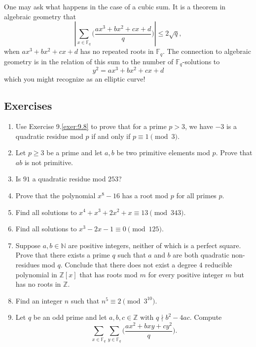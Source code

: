 \documentclass{article}
\def\Z{{\mathbb Z}}
\def\F{{\mathbb F}}
\def\N{{\mathbb N}}
\def\Z{{\mathbb Z}}
\def\F{{\mathbb F}}
\renewcommand{\lg}[2]{\Big(\frac{#1}{#2}\Big)}
\begin{document}
\vspace{5pt}
One may ask what happens in the case of a cubic sum. It is a theorem in algebraic geometry that
$$\left|\sum_{x\in\F_q} \lg{ax^3 + bx^2 + cx + d}{q}\right| \leq 2\sqrt{q},$$
when $ax^3 + bx^2 + cx + d$ has no repeated roots in $\F_q$. The connection to algebraic geometry is in the relation of this sum to the number of $\F_q$-solutions to $$y^2 = ax^3 + bx^2 + cx + d$$
which you might recognize as an elliptic curve!

\subsection*{Exercises}
\begin{enumerate}[\thesection .1]
    \item Use Exercise 9.\ref{exer:9.8} to prove that for a prime $p>3$, we have $-3$ is a quadratic residue mod $p$ if and only if $p\equiv 1\pmod{3}$.
    \item Let $p\geq 3$ be a prime and let $a,b$ be two primitive elements mod $p$. Prove that $ab$ is not primitive.
    \item Is $91$ a quadratic residue mod $253$?
    \item Prove that the polynomial $x^8 - 16$ has a root mod $p$ for all primes $p$.
    
    \item Find all solutions to $x^4 + x^3 + 2x^2 + x\equiv 13\pmod{343}$.
    \item Find all solutions to $x^3 - 2x - 1\equiv 0\pmod{125}.$
    \item Suppose $a,b\in\N$ are positive integers, neither of which is a perfect square. Prove that there exists a prime $q$ such that $a$ and $b$ are both quadratic non-residues mod $q$. Conclude that there does not exist a degree $4$ reducible polynomial in $\Z[x]$ that has roots mod $m$ for every positive integer $m$ but has no roots in $\Z$. \label{ex:11.7}
    \item Find an integer $n$ such that $n^5\equiv 2\pmod{3^{10}}.$
    \item Let $q$ be an odd prime and let $a,b,c\in\Z$ with $q\nmid b^2 - 4ac$. Compute $$\sum_{x\in\F_q}\sum_{y\in\F_q}\lg{ax^2 + bxy + cy^2}{q}.$$
\end{enumerate}
\end{document}
